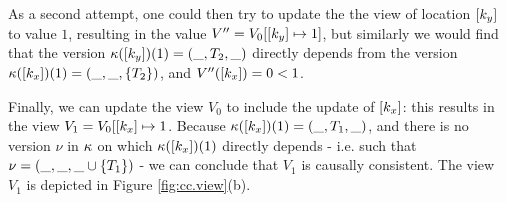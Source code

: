 \begin{example}
As a second attempt, one could then try to update the the view of location 
$[k_y]$ to value $1$, resulting in the value $V'' = V_0[ [k_y] \mapsto 1]$, 
but similarly we would find that the version 
$\kappa([k_y])(1) = (\_, T_2, \_)$ directly depends from the version 
$\kappa([k_x])(1) = (\_, \_, \{T_2\})$, and $V''([k_x]) = 0 < 1$. 

Finally, we can update the view $V_0$ to include the update of $[k_x]$: 
this results in the view $V_1 = V_0[ [k_x] \mapsto 1$. Because $\kappa([k_x])(1) 
= (\_, T_1, \_)$, and there is no version $\nu$ in $\kappa$ on which 
$\kappa([k_x])(1)$ directly depends - i.e. such that  
$\nu = (\_, \_, \_ \cup \{T_1\})$ - we can conclude that $V_1$ is causally 
consistent. The view $V_1$ is depicted in Figure \ref{fig:cc.view}(b).


\end{example}
